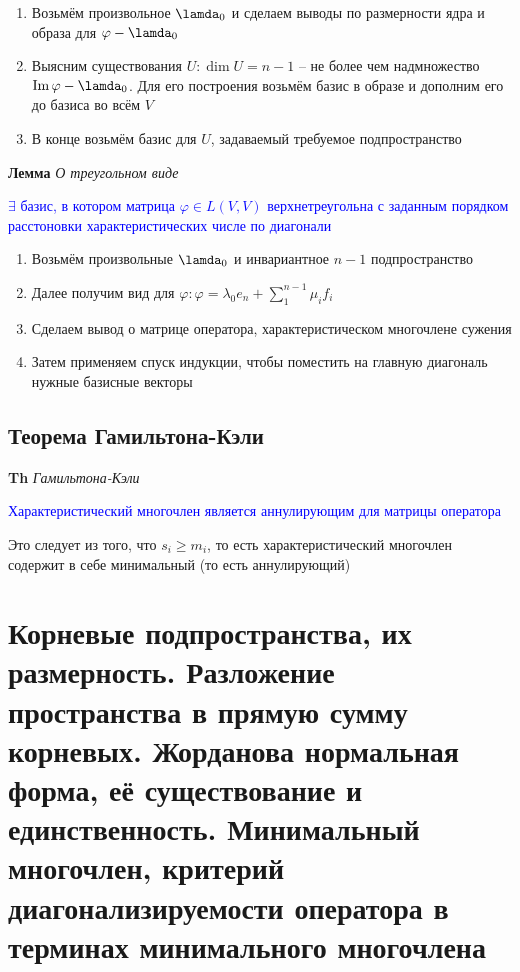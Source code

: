 \documentclass[a4paper, 14pt]{article}
\begin{document}
    \begin{enumerate}
        \item Возьмём произвольное $\lamda_0$ и сделаем выводы по размерности ядра и образа для $\varphi - \lamda_0$
        \item Выясним существования $U: \dim U = n - 1$ -- не более чем надмножество $\Im \varphi - \lamda_0$.
        Для его построения возьмём базис в образе и дополним его до базиса во всём $V$
        \item В конце возьмём базис для $U$, задаваемый требуемое подпространство
    \end{enumerate}

    \textbf{Лемма} \textit{О треугольном виде}

    \textcolor{blue}{$\exists$ базис, в котором матрица $\varphi \in L(V, V)$ верхнетреугольна с
    заданным порядком расстоновки характеристических числе по диагонали}

    \begin{enumerate}
        \item Возьмём произвольные $\lamda_0$ и инвариантное $n - 1$ подпространство
        \item Далее получим вид для $\varphi: \varphi = \lambda_0 e_n + \sum_1^{n-1} \mu_i f_i$
        \item Сделаем вывод о матрице оператора, характеристическом многочлене сужения
        \item Затем применяем спуск индукции, чтобы поместить на главную диагональ нужные базисные векторы
    \end{enumerate}

    \subsection{Теорема Гамильтона-Кэли}

    \textbf{Th} \textit{Гамильтона-Кэли}

    \textcolor{blue}{Характеристический многочлен является аннулирующим для матрицы оператора}

    Это следует из того, что $s_i \geq m_i$, то есть характеристический многочлен содержит в себе минимальный (то
    есть аннулирующий)

    \section{Корневые подпространства, их размерность.
    Разложение пространства в прямую сумму корневых.
    Жорданова нормальная форма, её существование и единственность.
    Минимальный многочлен, критерий диагонализируемости оператора в терминах минимального многочлена}
\end{document}
